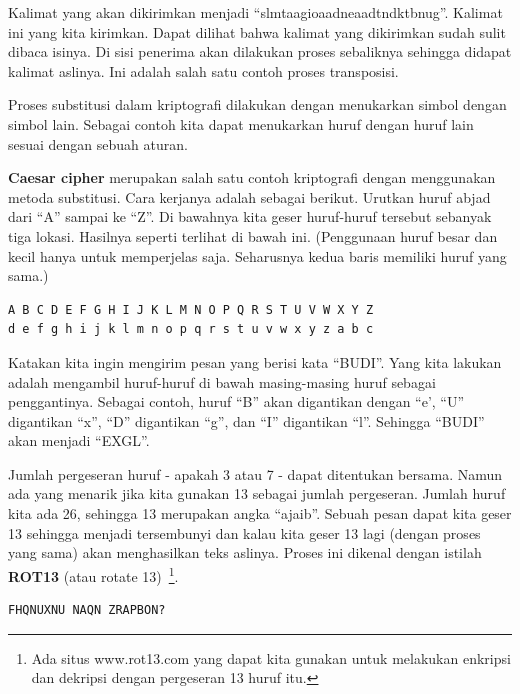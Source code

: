 Kalimat yang akan dikirimkan menjadi ``slmtaagioaadneaadtndktbnug''. Kalimat
ini yang kita kirimkan. Dapat dilihat bahwa kalimat yang dikirimkan sudah sulit
dibaca isinya. Di sisi penerima akan dilakukan proses sebaliknya sehingga
didapat kalimat aslinya. Ini adalah salah satu contoh proses transposisi.

Proses substitusi dalam kriptografi dilakukan dengan menukarkan simbol dengan
simbol lain. Sebagai contoh kita dapat menukarkan huruf dengan huruf lain
sesuai dengan sebuah aturan. 

{\bf Caesar cipher} merupakan salah satu contoh kriptografi dengan menggunakan
metoda substitusi. Cara kerjanya adalah sebagai berikut. Urutkan huruf abjad
dari ``A'' sampai ke ``Z''. Di bawahnya kita geser huruf-huruf tersebut
sebanyak tiga lokasi. Hasilnya seperti terlihat di bawah ini. (Penggunaan huruf
besar dan kecil hanya untuk memperjelas saja. Seharusnya kedua baris memiliki
huruf yang sama.)

\begin{mdframed}
\begin{verbatim}
A B C D E F G H I J K L M N O P Q R S T U V W X Y Z
d e f g h i j k l m n o p q r s t u v w x y z a b c
\end{verbatim}
\end{mdframed}

Katakan kita ingin mengirim pesan yang berisi kata ``BUDI''. Yang kita lakukan
adalah mengambil huruf-huruf di bawah masing-masing huruf sebagai penggantinya.
Sebagai contoh, huruf ``B'' akan digantikan dengan ``e', ``U'' digantikan
``x'', ``D'' digantikan ``g'', dan ``I'' digantikan ``l''. Sehingga ``BUDI''
akan menjadi ``EXGL''.

Jumlah pergeseran huruf - apakah 3 atau 7 - dapat ditentukan bersama. Namun ada
yang menarik jika kita gunakan 13 sebagai jumlah pergeseran. Jumlah huruf kita
ada 26, sehingga 13 merupakan angka ``ajaib''. Sebuah pesan dapat kita geser 13
sehingga menjadi tersembunyi dan kalau kita geser 13 lagi (dengan proses yang
sama) akan menghasilkan teks aslinya. Proses ini dikenal dengan istilah {\bf
ROT13} (atau rotate 13)~\footnote{Ada situs www.rot13.com yang dapat kita
gunakan untuk melakukan enkripsi dan dekripsi dengan pergeseran 13 huruf itu.}.

\begin{mdframed}                                                                   
\begin{verbatim} 
FHQNUXNU NAQN ZRAPBON?
\end{verbatim}
\end{mdframed}                                                                   

